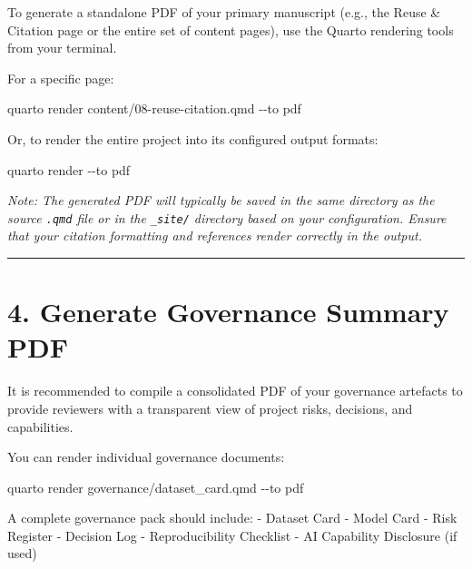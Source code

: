 \documentclass[
]{report}
\newenvironment{Shaded}{\begin{snugshade}}{\end{snugshade}}
\newcommand{\AttributeTok}[1]{\textcolor[rgb]{0.40,0.45,0.13}{#1}}
\newcommand{\ExtensionTok}[1]{\textcolor[rgb]{0.00,0.23,0.31}{#1}}
\newcommand{\NormalTok}[1]{\textcolor[rgb]{0.00,0.23,0.31}{#1}}
\begin{document}
To generate a standalone PDF of your primary manuscript (e.g., the Reuse
\& Citation page or the entire set of content pages), use the Quarto
rendering tools from your terminal.

For a specific page:

\begin{Shaded}
\begin{Highlighting}[]
\ExtensionTok{quarto}\NormalTok{ render content/08{-}reuse{-}citation.qmd }\AttributeTok{{-}{-}to}\NormalTok{ pdf}
\end{Highlighting}
\end{Shaded}

Or, to render the entire project into its configured output formats:

\begin{Shaded}
\begin{Highlighting}[]
\ExtensionTok{quarto}\NormalTok{ render }\AttributeTok{{-}{-}to}\NormalTok{ pdf}
\end{Highlighting}
\end{Shaded}

\emph{Note: The generated PDF will typically be saved in the same
directory as the source \texttt{.qmd} file or in the \texttt{\_site/}
directory based on your configuration. Ensure that your citation
formatting and references render correctly in the output.}

\begin{center}\rule{0.5\linewidth}{0.5pt}\end{center}

\chapter{4. Generate Governance Summary
PDF}\label{generate-governance-summary-pdf}

It is recommended to compile a consolidated PDF of your governance
artefacts to provide reviewers with a transparent view of project risks,
decisions, and capabilities.

You can render individual governance documents:

\begin{Shaded}
\begin{Highlighting}[]
\ExtensionTok{quarto}\NormalTok{ render governance/dataset\_card.qmd }\AttributeTok{{-}{-}to}\NormalTok{ pdf}
\end{Highlighting}
\end{Shaded}

A complete governance pack should include: - Dataset Card - Model Card -
Risk Register - Decision Log - Reproducibility Checklist - AI Capability
Disclosure (if used)
\end{document}
